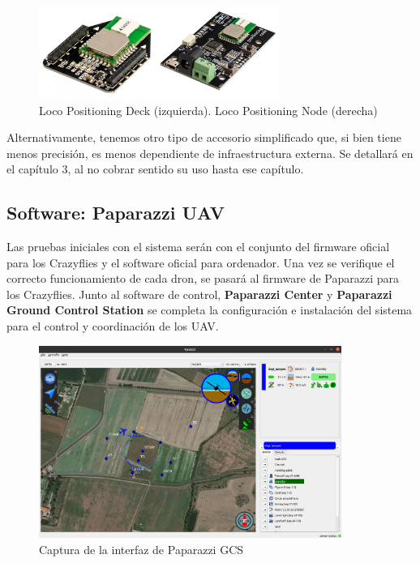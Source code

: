 \begin{figure}[h]
    \centering
    \includegraphics[clip, width=0.7\textwidth]{img/fig/fig1.2-loco-positioning-system.jpg}
    \caption{Loco Positioning Deck (izquierda). Loco Positioning Node (derecha)}
    \label{fig:loco_positioning_system}
\end{figure}

Alternativamente, tenemos otro tipo de accesorio simplificado que, 
si bien tiene menos precisión, es menos dependiente de infraestructura externa.
Se detallará en el capítulo 3, al no cobrar sentido su uso hasta ese capítulo.


\subsection{Software: Paparazzi UAV}

Las pruebas iniciales con el sistema serán con el conjunto del firmware oficial para los Crazyflies y el software oficial para ordenador. 
Una vez se verifique el correcto funcionamiento de cada dron, se pasará al firmware de Paparazzi para los Crazyflies. 
Junto al software de control, \textbf{Paparazzi Center} y \textbf{Paparazzi Ground Control Station} \cite{paparazzi_gcs} se completa la configuración e instalación del sistema para el control y coordinación de los UAV.

\begin{figure}[h]
    \centering
    \includegraphics[width=0.88\textwidth]{img/fig/fig1.3-paparazzi-gcs.png}
    \caption{Captura de la interfaz de Paparazzi GCS}
    \label{fig:paparazzi_gcs}
\end{figure}


